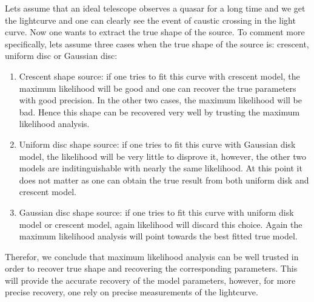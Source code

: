 Lets assume that an ideal telescope observes a quasar for a long time and we get the lightcurve  and one can clearly see the event of caustic crossing in the light curve. Now one wants to extract the true shape of the source. To comment more specifically, lets assume three cases when the true shape of the source is: crescent, uniform disc or Gaussian disc:

\begin{enumerate}

\item Crescent shape source: if one tries to fit this curve with crescent model, the maximum likelihood will be good and one can recover the true parameters with good precision. In the other two cases, the maximum likelihood will be bad. Hence this shape can be recovered very well by trusting the maximum likelihood analysis.
\item Uniform disc shape source: if one tries to fit this curve with Gaussian disk model, the likelihood will be very little to disprove it, however, the other two models are inditinguishable with nearly the same likelihood. At this point it does not matter as one can obtain the true result from both uniform disk and crescent model.
\item Gaussian disc shape source: if one tries to fit this curve with uniform disk model or crescent model, again likelihood will discard this choice. Again the maximum likelihood analysis will point towards the best fitted true model.
\end{enumerate}

Therefor, we conclude that maximum likelihood analysis can be well trusted in order to recover true shape and recovering the corresponding parameters. This will provide the accurate recovery of the model parameters, however, for more precise recovery, one rely on precise measurements of the lightcurve. 

 
